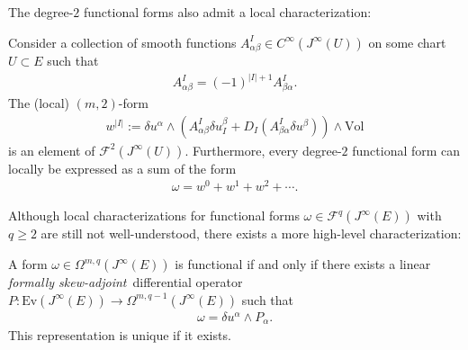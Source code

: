     The degree-$2$ functional forms also admit a local characterization:
    \begin{property}
        Consider a collection of smooth functions $A^I_{\alpha\beta}\in C^\infty(J^\infty(U))$ on some chart $U\subset E$ such that
        \begin{gather}
            A^I_{\alpha\beta} = (-1)^{|I|+1}A^I_{\beta\alpha}.
        \end{gather}
        The (local) $(m,2)$-form
        \begin{gather}
            w^{|I|} := \delta u^\alpha\wedge\left(A^I_{\alpha\beta}\delta u^\beta_I + D_I(A^I_{\beta\alpha}\delta u^\beta)\right)\wedge\text{Vol}
        \end{gather}
        is an element of $\mathcal{F}^2(J^\infty(U))$. Furthermore, every degree-$2$ functional form can locally be expressed as a sum of the form
        \begin{gather}
            \omega = w^0 + w^1 + w^2 + \cdots.
        \end{gather}
    \end{property}

    Although local characterizations for functional forms $\omega\in\mathcal{F}^q(J^\infty(E))$ with $q\geq2$ are still not well-understood, there exists a more high-level characterization:
    \begin{property}
        A form $\omega\in\Omega^{m,q}(J^\infty(E))$ is functional if and only if there exists a linear \textit{formally skew-adjoint}\footnotemark\ differential operator $P:\text{Ev}(J^\infty(E))\rightarrow\Omega^{m,q-1}(J^\infty(E))$ such that
        \begin{gather}
            \omega = \delta u^\alpha\wedge P_\alpha.
        \end{gather}
        This representation is unique if it exists.
    \end{property}

